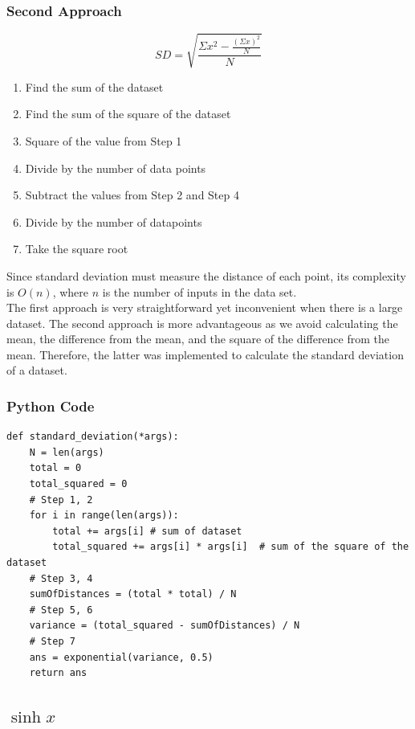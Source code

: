 \documentclass[11pt,onside]{report}
\begin{document}
\subsubsection{Second Approach}
\begin{equation}
    SD = \sqrt{\frac{\Sigma x^2 - \frac{(\Sigma x)^2}{N}}{N}}
\end{equation}
\begin{enumerate}
    \item Find the sum of the dataset
    \item Find the sum of the square of the dataset
    \item Square of the value from Step 1
    \item Divide by the number of data points
    \item Subtract the values from Step 2 and Step 4
    \item Divide by the number of datapoints
    \item Take the square root
\end{enumerate}

Since standard deviation must measure the distance of each point, its complexity is $O(n)$, where $n$ is the number of inputs in the data set. \\

The first approach is very straightforward yet inconvenient when there is a large dataset. The second approach is more advantageous as we avoid calculating the mean, the difference from the mean, and the square of the difference from the mean. Therefore, the latter was implemented to calculate the standard deviation of a dataset. \cite{sd-implementation}
\\
\subsubsection{Python Code}
\begin{lstlisting}
def standard_deviation(*args):
    N = len(args)
    total = 0
    total_squared = 0
    # Step 1, 2
    for i in range(len(args)):
        total += args[i] # sum of dataset
        total_squared += args[i] * args[i]  # sum of the square of the dataset
    # Step 3, 4
    sumOfDistances = (total * total) / N
    # Step 5, 6
    variance = (total_squared - sumOfDistances) / N
    # Step 7
    ans = exponential(variance, 0.5)
    return ans
\end{lstlisting}
\subsection{$\sinh{x}$}
\end{document}
